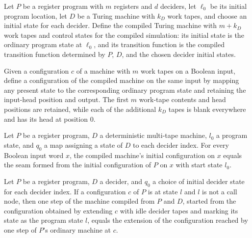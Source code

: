 \begin{definition}
\label{Complexity.LogProg.compileTM}
\leanok
{}
Let $P$ be a register program with $m$ registers and $d$ deciders, let $\ell_0$ be its
initial program location, let $D$ be a Turing machine with $k_D$ work tapes, and choose
an initial state for each decider. Define the compiled Turing machine with $m+k_D$ work
tapes and control states for the compiled simulation: its initial state is the ordinary
program state at $\ell_0$, and its transition function is the compiled transition
function determined by $P$, $D$, and the chosen decider initial states.
\end{definition}

\begin{definition}
\label{Complexity.LogProg.seam}
\leanok
{}
Given a configuration $c$ of a machine with $m$ work tapes on a Boolean input, define a
configuration of the compiled machine on the same input by mapping any present state to
the corresponding ordinary program state and retaining the input-head position and
output. The first $m$ work-tape contents and head positions are retained, while each of
the additional $k_D$ tapes is blank everywhere and has its head at position $0$.
\end{definition}

\begin{lemma}
\label{Complexity.LogProg.seam_init}
\leanok
{}
Let $P$ be a register program, $D$ a deterministic multi-tape machine, $l_0$ a program
state, and $q_0$ a map assigning a state of $D$ to each decider index. For every Boolean
input word $x$, the compiled machine's initial configuration on $x$ equals the seam
formed from the initial configuration of $P$ on $x$ with start state $l_0$.
\end{lemma}

\begin{lemma}
\label{Complexity.LogProg.step_seam_prog}
\leanok
{}
Let $P$ be a register program, $D$ a decider, and $q_0$ a choice of initial decider
state for each decider index. If a configuration $c$ of $P$ is at state $l$ and $l$ is
not a call node, then one step of the machine compiled from $P$ and $D$, started from
the configuration obtained by extending $c$ with idle decider tapes and marking its
state as the program state $l$, equals the extension of the configuration reached by one
step of $P$'s ordinary machine at $c$.
\end{lemma}

